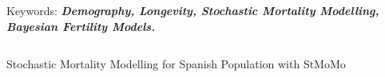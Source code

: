 \documentclass[]{beamer}
\begin{document}
\begin{frame}{\vspace{1ex}\hfill Keywords: \bfseries \textit{Demography, Longevity, Stochastic Mortality Modelling, Bayesian Fertility Models.}}
\begin{columns}[t]
\begin{block}{Stochastic Mortality Modelling for Spanish Population with StMoMo}
\begin{figure}[h]
			\end{figure}
\vspace{-0.2cm}
		\end{block}
		

	
	\vspace{-1.5cm}   %
		

\end{columns}
\end{frame}
\end{document}

